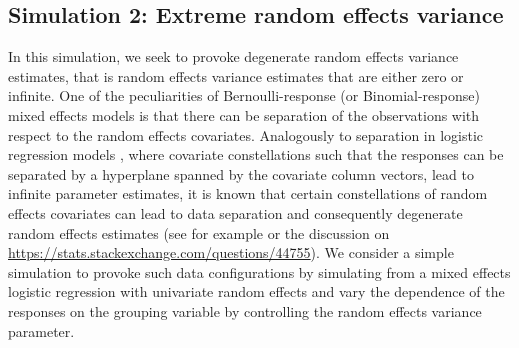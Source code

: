 \documentclass[11pt, a4paper]{article}
\theoremstyle{example} \newtheorem{example}{Example}[section]
\theoremstyle{theorem} \newtheorem{theorem}{Theorem}[section]
\theoremstyle{theorem }\newtheorem{proposition}{Proposition}[section]
\theoremstyle{theorem }\newtheorem{corollary}{Corollary}[section]
\begin{document}
\subsection{Simulation 2: Extreme random effects variance} \label{sec:sim2}
In this simulation, we seek to provoke degenerate random effects variance estimates, that is random effects variance estimates that are either zero or infinite. One of the peculiarities of Bernoulli-response (or Binomial-response) mixed effects models is that there can be separation of the observations with respect to the random effects covariates. Analogously to separation in logistic regression models \citep{albert+anderson:1984}, where covariate constellations such that the responses can be separated by a hyperplane spanned by the covariate column vectors, lead to infinite parameter estimates, it is known that certain constellations of random effects covariates can lead to data separation and consequently degenerate random effects estimates (see for example \citet{sauter+held:2016} or the discussion on \url{https://stats.stackexchange.com/questions/44755}). We consider a simple simulation to provoke such data configurations by simulating from a mixed effects logistic regression with univariate random effects and vary the dependence of the responses on the grouping variable by controlling the random effects variance parameter. 
\end{document}
